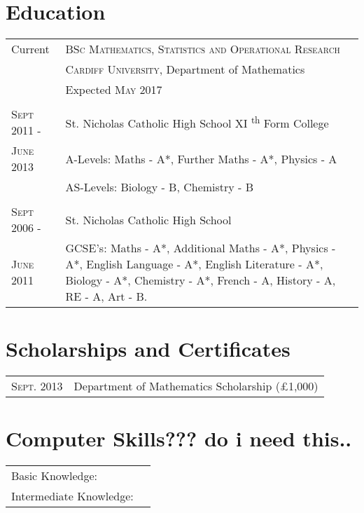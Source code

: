 \documentclass[a4paper, 11pt]{article}
\begin{document}
\section{Education}
\begin{tabularx}{\textwidth}{lX}

Current & \textsc{BSc Mathematics, Statistics and Operational Research} \\
&\normalsize \textsc{Cardiff University}, Department of Mathematics\\
& Expected \textsc{May} 2017\\
\\
\textsc{Sept 2011 -} & St. Nicholas Catholic High School XI \textsuperscript{th} Form College\\
\textsc{June 2013} & A-Levels: Maths - A*, Further Maths - A*, Physics - A\\
& AS-Levels: Biology - B, Chemistry - B\\
\\
\textsc{Sept 2006 -} & St. Nicholas Catholic High School\\
\textsc{June 2011} & GCSE's: Maths - A*, Additional Maths - A*, Physics - A*, English Language - A*, English Literature - A*, Biology - A*, Chemistry - A*, French - A, History - A, RE - A, Art - B.\\

\end{tabularx}
\section{Scholarships and Certificates}
\begin{tabularx}{\textwidth}{lX}

\textsc{Sept.} 2013 & Department of Mathematics Scholarship (\pounds1,000)\\

\end{tabularx}
\section{Computer Skills??? do i need this..}
\begin{tabularx}{\textwidth}{lX}

Basic Knowledge: & \\
Intermediate Knowledge: &\\

\end{tabularx}
\end{document}
